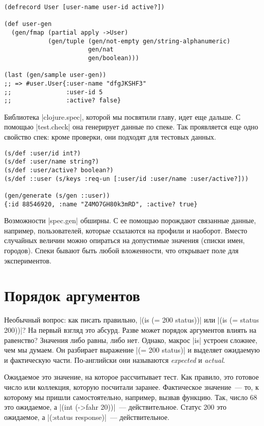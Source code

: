 \begin{verbatim}
(defrecord User [user-name user-id active?])

(def user-gen
  (gen/fmap (partial apply ->User)
            (gen/tuple (gen/not-empty gen/string-alphanumeric)
                       gen/nat
                       gen/boolean)))

(last (gen/sample user-gen))
;; => #user.User{:user-name "dfgJKSHF3"
;;               :user-id 5
;;               :active? false}
\end{verbatim}

Библиотека \spverb|clojure.spec|, которой мы посвятили главу, идет еще дальше. С
помощью \spverb|test.check| она генерирует данные по спеке. Так проявляется еще одно
свойство спек: кроме проверки, они подходят для тестовых данных.

\begin{verbatim}
(s/def :user/id int?)
(s/def :user/name string?)
(s/def :user/active? boolean?)
(s/def ::user (s/keys :req-un [:user/id :user/name :user/active?]))

(gen/generate (s/gen ::user))
{:id 88546920, :name "Z4MO7GH80k3mRD", :active? true}
\end{verbatim}

Возможности \spverb|spec.gen| обширны. С ее помощью порождают связанные данные,
например, пользователей, которые ссылаются на профили и наоборот. Вместо
случайных величин можно опираться на допустимые значения (списки имен,
городов). Спеки бывают быть любой вложенности, что открывает поле для
экспериментов.

\section{Порядок аргументов}

Необычный вопрос: как писать правильно, \spverb|(is (= 200 status))| или
\spverb|(is (= status 200))|? На первый взгляд это абсурд. Разве может порядок
аргументов влиять на равенство? Значения либо равны, либо нет. Однако, макрос
\spverb|is| устроен сложнее, чем мы думаем. Он разбирает выражение \spverb|(= 200 status)|
и выделяет ожидаемую и фактическую части. По-английски они
называются \emph{expected} и \emph{actual}.

Ожидаемое это значение, на которое рассчитывает тест. Как правило, это готовое
число или коллекция, которую посчитали заранее. Фактическое значение~--- то, к
которому мы пришли самостоятельно, например, вызвав функцию. Так, число 68 это
ожидаемое, а \spverb|(int (->fahr 20))|~--- действительное. Статус 200 это ожидаемое, а
\spverb|(:status response)|~--- действительное.

